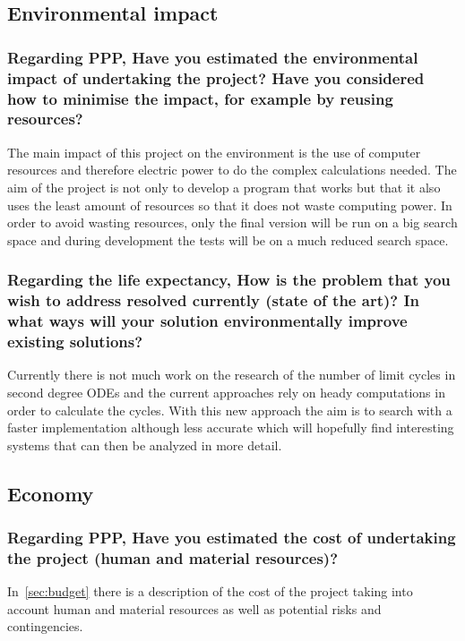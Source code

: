 \subsection{Environmental impact}

\subsubsection*{Regarding PPP, Have you estimated the environmental impact of
undertaking the project? Have you considered how to minimise the impact, for
example by reusing resources?}

The main impact of this project on the environment is the use of computer
resources and therefore electric power to do the complex calculations needed.
The aim of the project is not only to develop a program that works but that it
also uses the least amount of resources so that it does not waste computing
power. In order to avoid wasting resources, only the final version will be run
on a big search space and during development the tests will be on a much reduced
search space.

\subsubsection*{Regarding the life expectancy, How is the problem that you wish
to address resolved currently (state of the art)? In what ways will your
solution environmentally improve existing solutions?}

Currently there is not much work on the research of the number of limit cycles
in second degree ODEs and the current approaches rely on heady computations in
order to calculate the cycles. With this new approach the aim is to search with
a faster implementation although less accurate which will hopefully find
interesting systems that can then be analyzed in more detail.


\pagebreak
\subsection{Economy}

\subsubsection*{Regarding PPP, Have you estimated the cost of undertaking the
project (human and material resources)?}

In~\cref{sec:budget} there is a description of the cost of the project taking
into account human and material resources as well as potential risks and
contingencies.


